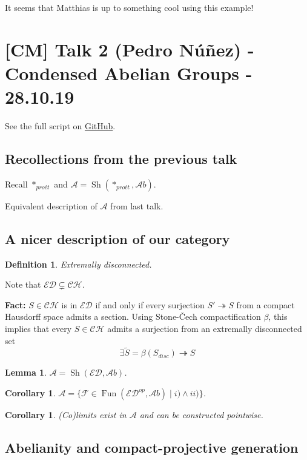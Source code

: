 \documentclass[12pt]{article}
\theoremstyle{darkgreentheorem}
\newtheorem{lm}[thm]{Lemma}
\newtheorem{cor}[thm]{Corollary}
\theoremstyle{darkbluedefinition}
\newtheorem{defn}[thm]{Definition}
\theoremstyle{darkredexample}
\theoremstyle{remark}
\newcommand{\1}{\mathbbm{1}}
\newcommand{\ED}{\mathscr{ED}}
\newcommand{\A}{\mathscr{A}}
\newcommand{\Ab}{\mathscr{A}b}
\newcommand{\F}{\mathcal{F}}
\DeclareMathOperator{\Fun}{Fun}
\DeclareMathOperator{\Sh}{Sh}
\newcommand{\pe}{*_{proét}}
\begin{document}
It seems that Matthias is up to something cool using this example!

\section{[CM] Talk 2 (Pedro Núñez) - Condensed Abelian Groups - 28.10.19}

See the full script on \href{https://github.com/pedro-nlb/cag}{GitHub}.

\subsection{Recollections from the previous talk}

Recall $\pe$ and $\A=\Sh(\pe,\Ab)$.

Equivalent description of $\A$ from last talk.

\subsection{A nicer description of our category}

\begin{defn}
    Extremally disconnected.
\end{defn}

Note that $\mathscr{ED}\subsetneq \mathscr{CH}$.

\textbf{Fact:} $S\in \mathscr{CH}$ is in $\mathscr{ED}$ if and only if every surjection $S'\twoheadrightarrow S$ from a compact Hausdorff space admits a section.
Using Stone-\v{C}ech compactification $\beta$, this implies that every $S\in \mathscr{CH}$ admits a surjection from an extremally disconnected set
\[ \exists \tilde{S}=\beta(S_{disc})\twoheadrightarrow S \]

\begin{lm}
    $\A=\Sh(\ED,\Ab)$.
\end{lm}

\begin{cor}
$\A=\{ \F\in \Fun(\ED^{op},\Ab)\mid i) \wedge ii)\}$.
\end{cor}

\begin{cor}
(Co)limits exist in $\A$ and can be constructed pointwise.
\end{cor}

\subsection{Abelianity and compact-projective generation}
\end{document}
